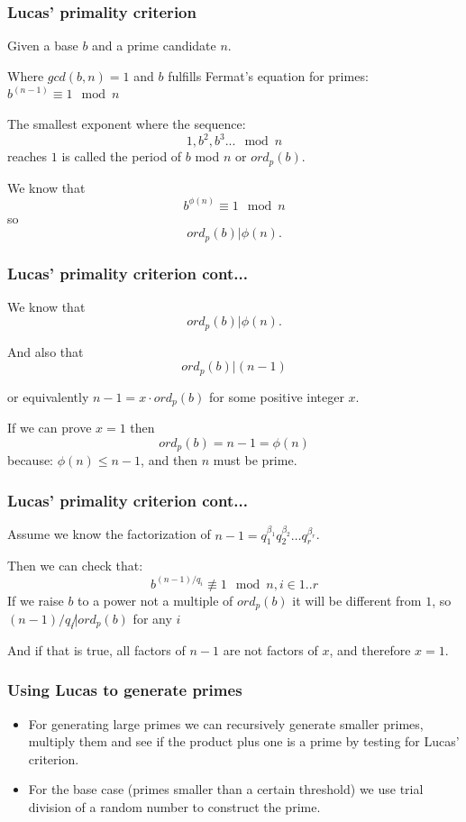 \documentclass{beamer}
\begin{document}
\begin{frame}
\frametitle{Lucas' primality criterion}

Given a base $b$ and a prime candidate $n$. 

Where $gcd(b, n)=1$ and $b$ fulfills Fermat's equation for primes:
$b^{(n-1)}  \equiv  1    \mod n$

The smallest exponent where the sequence:
\[1, b^2, b^3 ... \mod n\]
reaches $1$ is called the period of $b$ mod $n$ or $ord_p(b)$. 

We know that 
\[b^{\phi(n)} \equiv 1 \mod n\]
 so 
\[ord_p(b)|\phi(n).\] 

\end{frame}
\begin{frame}
\frametitle{Lucas' primality criterion cont...}
We know that
\[ord_p(b)|\phi(n).\] 

And also that 
\[ord_p(b)|(n-1)\]

or equivalently $n-1 = x\cdot ord_p(b)$ for some positive integer $x$.

If we can prove $x=1$ then 
\[ord_p(b)=n-1=\phi(n)\] 
because: $\phi(n) \leq
n-1$, and then $n$ must be prime.
\end{frame}
\begin{frame}
\frametitle{Lucas' primality criterion cont...}
Assume we know the factorization of $n-1 = q_1^{\beta_1}q_2^{\beta_2}\ldots q_r^{\beta_r}$.

Then we can check that:
\[b^{(n-1)/q_i}\not\equiv 1 \mod n, i\in{1..r}\] If we raise $b$
to a power not a multiple of $ord_p(b)$ it will be different from $1$,
so $(n-1)/q_i\not|ord_p(b)$ for any $i$ 

And if that is true, all factors of $n-1$ are not factors of $x$, and
therefore $x=1$.

\end{frame}
\begin{frame}
\frametitle{Using Lucas to generate primes}

\begin{itemize}
\item 
  For generating large primes we can recursively generate smaller
  primes, multiply them and see if the product plus one is a prime by
  testing for Lucas' criterion.
\pause
\item
  For the base case (primes smaller than a certain threshold) we use
  trial division of a random number to construct the prime.
\end{itemize}
\end{frame}
\end{document}
